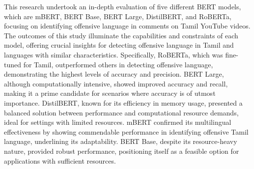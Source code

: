 \documentclass{svproc}
\begin{document}
This research undertook an in-depth evaluation of five different BERT models, which are mBERT, BERT Base, BERT Large, DistilBERT, and RoBERTa, focusing on identifying offensive language in comments on Tamil YouTube videos. The outcomes of this study illuminate the capabilities and constraints of each model, offering crucial insights for detecting offensive language in Tamil and languages with similar characteristics. Specifically, RoBERTa, which was fine-tuned for Tamil, outperformed others in detecting offensive language, demonstrating the highest levels of accuracy and precision. BERT Large, although computationally intensive, showed improved accuracy and recall, making it a prime candidate for scenarios where accuracy is of utmost importance. DistilBERT, known for its efficiency in memory usage, presented a balanced solution between performance and computational resource demands, ideal for settings with limited resources. mBERT confirmed its multilingual effectiveness by showing commendable performance in identifying offensive Tamil language, underlining its adaptability. BERT Base, despite its resource-heavy nature, provided robust performance, positioning itself as a feasible option for applications with sufficient resources.
%
%

\renewcommand{\bibname}{REFERENCES}

\end{document}
